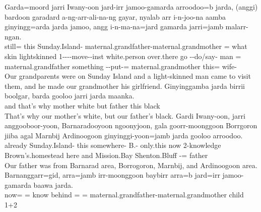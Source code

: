 \begin{exye}
\exy {}
\gll Garda=moord jarri Iwany-oon jard-irr jamoo-gamarda arroodoo=b jarda, (anggi) bardoon garadard a-ng-arr-ali-na-ng gayar, nyalab arr i-n-joo-na aamba ginyingg=arda jarda jamoo, angg i-n-ma-na=jard gamarda jarri=jamb malarr-ngan.\\
still= this Sunday.Island-  maternal.grandfather-maternal.grandmother =  what skin lightskinned 1----move--inst white.person over.there go --do/say- man =  maternal.grandfather something --put-= maternal.grandmother this= wife-\\
\ft Our grandparents were on Sunday Island and a light-skinned man came to visit them, and he made our grandmother his girlfriend.
\exy {}
\gll Ginyinggamba jarda birrii boolgar, barda gooloo jarri jarda maanka.\\
and that's why  mother white but father this  black\\
\ft That's why our mother's white, but our father's black.
\exy {}
\gll Gardi Iwany-oon, jarri anggooboor-yoon, Barnaradooyoon ngoonyjoon, gala goorr-moonggoon Borrgoron jiiba agal Marnbij Ardinoogoon ginyinggi-yoon=jamb jarda gooloo arroodoo.\\
already Sunday.Island- this somewhere- B.- only.this now 2-knowledge Brown's.homestead here and Mission.Bay Shenton.Bluff -=  father \\
\ft Our father was from Barnarad area, Borrogoron, Marnbij, and Ardinoogoon area.
\exy {}
\gll Barnanggarr=gid, arra=jamb irr-moonggoon baybirr arra=b jard=irr jamoo-gamarda baawa jarda.\\
now= = know behind = = maternal.grandfather-maternal.grandmother child 1+2\\

\end{exye}
